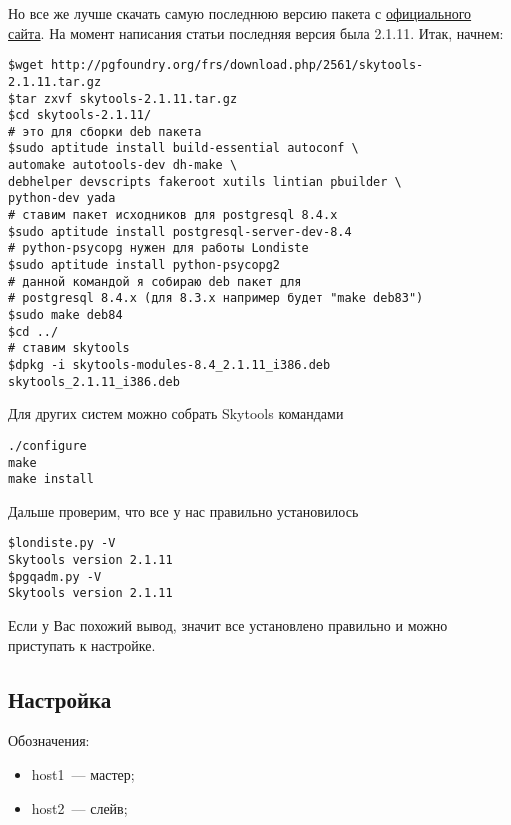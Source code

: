 Но все же лучше скачать самую последнюю версию пакета с \href{http://pgfoundry.org/projects/skytools}{официального сайта}.
На момент написания статьи последняя версия была 2.1.11. Итак, начнем:

\begin{lstlisting}[label=lst:londiste2,caption=Установка]
$wget http://pgfoundry.org/frs/download.php/2561/skytools-2.1.11.tar.gz
$tar zxvf skytools-2.1.11.tar.gz
$cd skytools-2.1.11/
# это для сборки deb пакета
$sudo aptitude install build-essential autoconf \
automake autotools-dev dh-make \
debhelper devscripts fakeroot xutils lintian pbuilder \
python-dev yada
# ставим пакет исходников для postgresql 8.4.x
$sudo aptitude install postgresql-server-dev-8.4
# python-psycopg нужен для работы Londiste
$sudo aptitude install python-psycopg2
# данной командой я собираю deb пакет для
# postgresql 8.4.x (для 8.3.x например будет "make deb83")
$sudo make deb84
$cd ../
# ставим skytools
$dpkg -i skytools-modules-8.4_2.1.11_i386.deb
skytools_2.1.11_i386.deb
\end{lstlisting}

Для других систем можно собрать Skytools командами

\begin{lstlisting}[label=lst:londiste3,caption=Установка]
./configure
make
make install
\end{lstlisting}

Дальше проверим, что все у нас правильно установилось
\begin{lstlisting}[label=lst:londiste4,caption=Установка]
$londiste.py -V
Skytools version 2.1.11
$pgqadm.py -V
Skytools version 2.1.11
\end{lstlisting}

Если у Вас похожий вывод, значит все установлено правильно и можно приступать к настройке.


\subsection{Настройка}
Обозначения:
\begin{itemize}
\item host1~--- мастер;
\item host2~--- слейв;
\end{itemize}


